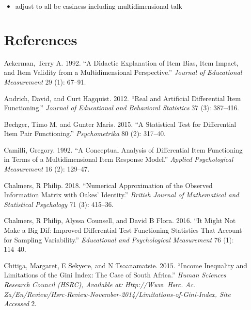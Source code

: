 \documentclass[
  11pt,
]{article}
\providecommand{\tightlist}{%
  \setlength{\itemsep}{0pt}\setlength{\parskip}{0pt}}
\begin{document}
\begin{itemize}
\tightlist
\item
  adjust to all be easiness including multidimensional talk
\end{itemize}

\hypertarget{references}{%
\section{References}\label{references}}




\hypertarget{refs}{}
\leavevmode\hypertarget{ref-ackerman1992didactic}{}%
Ackerman, Terry A. 1992. ``A Didactic Explanation of Item Bias, Item Impact, and Item Validity from a Multidimensional Perspective.'' \emph{Journal of Educational Measurement} 29 (1): 67--91.

\leavevmode\hypertarget{ref-andrich2012real}{}%
Andrich, David, and Curt Hagquist. 2012. ``Real and Artificial Differential Item Functioning.'' \emph{Journal of Educational and Behavioral Statistics} 37 (3): 387--416.

\leavevmode\hypertarget{ref-bechger2015statistical}{}%
Bechger, Timo M, and Gunter Maris. 2015. ``A Statistical Test for Differential Item Pair Functioning.'' \emph{Psychometrika} 80 (2): 317--40.

\leavevmode\hypertarget{ref-camilli1992conceptual}{}%
Camilli, Gregory. 1992. ``A Conceptual Analysis of Differential Item Functioning in Terms of a Multidimensional Item Response Model.'' \emph{Applied Psychological Measurement} 16 (2): 129--47.

\leavevmode\hypertarget{ref-chalmers2018numerical}{}%
Chalmers, R Philip. 2018. ``Numerical Approximation of the Observed Information Matrix with Oakes' Identity.'' \emph{British Journal of Mathematical and Statistical Psychology} 71 (3): 415--36.

\leavevmode\hypertarget{ref-chalmers2016might}{}%
Chalmers, R Philip, Alyssa Counsell, and David B Flora. 2016. ``It Might Not Make a Big Dif: Improved Differential Test Functioning Statistics That Account for Sampling Variability.'' \emph{Educational and Psychological Measurement} 76 (1): 114--40.

\leavevmode\hypertarget{ref-chitiga2015income}{}%
Chitiga, Margaret, E Sekyere, and N Tsoanamatsie. 2015. ``Income Inequality and Limitations of the Gini Index: The Case of South Africa.'' \emph{Human Sciences Research Council (HSRC), Available at: Http://Www. Hsrc. Ac. Za/En/Review/Hsrc-Review-November-2014/Limitations-of-Gini-Index, Site Accessed} 2.
\end{document}
